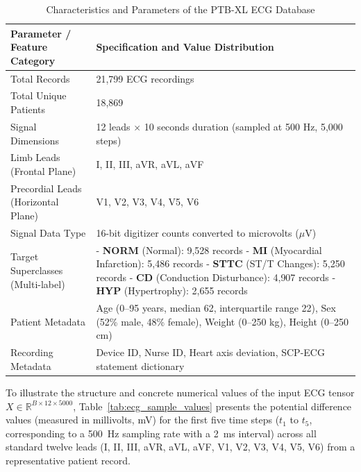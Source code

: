 \documentclass[12pt,a4paper]{report}
\begin{document}
\begin{table}[H]
\caption{Characteristics and Parameters of the PTB-XL ECG Database}
\label{tab:ptbxl_properties}
\centering
\begin{tabular}{lp{9cm}}
\toprule
\textbf{Parameter / Feature Category} & \textbf{Specification and Value Distribution} \\
\midrule
Total Records & 21,799 ECG recordings \\
Total Unique Patients & 18,869 \\
Signal Dimensions & 12 leads $\times$ 10 seconds duration (sampled at 500 Hz, 5,000 steps) \\
Limb Leads (Frontal Plane) & I, II, III, aVR, aVL, aVF \\
Precordial Leads (Horizontal Plane) & V1, V2, V3, V4, V5, V6 \\
Signal Data Type & 16-bit digitizer counts converted to microvolts ($\mu\text{V}$) \\
Target Superclasses (Multi-label) & 
  - \textbf{NORM} (Normal): 9,528 records \newline
  - \textbf{MI} (Myocardial Infarction): 5,486 records \newline
  - \textbf{STTC} (ST/T Changes): 5,250 records \newline
  - \textbf{CD} (Conduction Disturbance): 4,907 records \newline
  - \textbf{HYP} (Hypertrophy): 2,655 records \\
Patient Metadata & Age (0–95 years, median 62, interquartile range 22), Sex (52\% male, 48\% female), Weight (0–250 kg), Height (0–250 cm) \\
Recording Metadata & Device ID, Nurse ID, Heart axis deviation, SCP-ECG statement dictionary \\
\bottomrule
\end{tabular}
\end{table}

To illustrate the structure and concrete numerical values of the input ECG tensor $X \in \mathbb{R}^{B \times 12 \times 5000}$, Table~\ref{tab:ecg_sample_values} presents the potential difference values (measured in millivolts, mV) for the first five time steps ($t_1$ to $t_5$, corresponding to a 500~Hz sampling rate with a 2~ms interval) across all standard twelve leads (I, II, III, aVR, aVL, aVF, V1, V2, V3, V4, V5, V6) from a representative patient record.
\end{document}
